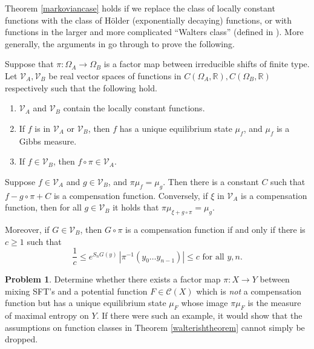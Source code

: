 \documentclass{kepart2010}
\theoremstyle{plain}
\theoremstyle{definition}
\newtheorem{prob}[thm]{Problem}
\theoremstyle{remark}
\theoremstyle{definition}
\numberwithin{equation}{section}
\begin{document}
Theorem \ref{markoviancase} holds if we replace the class of locally
constant functions with the class of H\"{o}lder (exponentially
decaying) functions, or with functions in the larger and more
complicated ``Walters class'' (defined in \cite[Section
4]{Walters1986}). More generally, the arguments in  \cite[Theorem
4.1]{Walters1986} go through to prove the following.

\begin{thm}\label{walterishtheorem}
Suppose that $\pi : \Omega_A \to \Omega_B$ is a factor map between
irreducible shifts of finite type. Let $\mathcal V_A,\mathcal V_B$ be real
vector spaces of functions in $C(\Omega_A, \mathbb R),C(\Omega_B,
\mathbb R)$ respectively such that the following hold.
\begin{enumerate}
\item
$\mathcal V_A$ and $\mathcal V_B$ contain the locally constant
  functions.
\item
If $f$ is in $\mathcal V_A$ or $\mathcal V_B$,
then $f$ has a unique equilibrium
state $\mu_f$, and $\mu_f$ is a Gibbs measure.
\item
If $f\in \mathcal V_B$, then $f\circ \pi \in \mathcal V_A$.
\end{enumerate}
Suppose $f\in \mathcal V_A$ and
$g\in \mathcal V_B$, and $\pi \mu_f = \mu_g$. Then there is a
constant $C$ such that
$f-g\circ \pi +C$ is a compensation function. Conversely, if
$\xi$ in $\mathcal V_A$ is a
 compensation function,
then for all $g\in \mathcal V_B$ it holds that
$\pi \mu_{\xi+g\circ \pi}  = \mu_g$.

Moreover, if $G \in \mathcal V_B$, then $G\circ \pi$ is a
compensation function if and only if there is $c \geq 1$ such that
\begin{equation}
\frac{1}{c} \leq e^{S_nG(y)} \, |\pi^{-1}(y_0\dots y_{n-1})| \leq c
\text{ for all } y,n.
\end{equation}
\end{thm}

 {\begin{prob}\label{prob_wishingforcompfn} Determine whether there
exists a factor map $\pi :X \to Y$ between mixing SFT's and a
potential function $F \in {{\mathcal C}}(X)$ which is {\em not} a compensation
function but has a unique equilibrium state $\mu_F$ whose image
$\pi\mu_F$ is the measure of maximal entropy on $Y$. If there were
such an example, it would show that the assumptions on function
classes in Theorem \ref{walterishtheorem} cannot simply be dropped.
\end{prob} }
\end{document}
